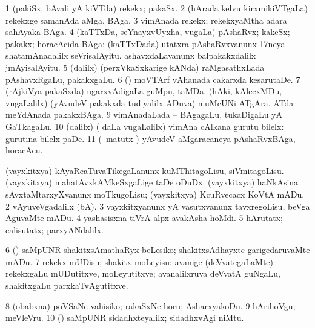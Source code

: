 {{{{{{\bentry
{} 
\gl{\nA}
\expl{}
\bmng
\bnum
\num{1} (pakiSx, bAvali yA kiVTda) rekekx; pakaSx. 
\num{2} (hArada kelvu kirxmikiVTgaLa) rekekxge samanAda aMga, BAga. 
\num{3} vimAnada rekekx; rekekxyaMtha adara sahAyaka BAga. 
\num{4} (kaTTxDa, seYnayxvUyxha, \mo vugaLa) pAshaRvx; kakeSx; pakakx; horacAcida BAga:  (kaTTxDada) utatxra pAshaRvxvanunx 17neya shatamAnadalilx seVrisalAyitu.  ashavxdaLavanunx balpakakxdalilx jmAyisalAyitu. 
\num{5} (\bava dalilx) (perxVkaSxkarige kANda) raMgasathxLada pAshavxRgaLu, pakakxgaLu. 
\num{6} (\birx) moVTArf vAhanada cakarxda kesarutaDe. 
\num{7} (rAjkiVya pakaSxda) ugarxvAdigaLa guMpu, taMDa. 
 (hAki, kAlecxMDu, \mo vugaLalilx) 
\banum
{} (yAvudeV pakakxda tudiyalilx ADuva) muMcUNi ATgAra. 
 ATda meYdAnada pakakxBAga. 
\eanum
\numie
\num{9} vimAnadaLada -- BAgagaLu, tukaDigaLu yA GaTkagaLu. 
\num{10} (\bava dalilx) ( daLa \mo vugaLalilx) vimAna cAlkana gurutu bilelx:  gurutina bilelx paDe. 
\num{11} (\aMrashA\ matutx \savi) yAvudeV aMgaracaneya pAshaRvxBAga, horacAcu. 
\enum
\emng

\noindent
\gl{\pagu}
\bmng
\bnum
{}  
\banum
{} (vayxkitxya) kAyaRcaTuvaTikegaLanunx kuMThitagoLisu, siVmitagoLisu. 
 (vayxkitxya) mahatAvxkAMkeSxgaLige taDe oDuDx. 
 (vayxkitxya) haNkAsina sAvxtaMtarxyXvanunx moTkugoLisu; (vayxkitxya) KcuRvecacx KoVtA mADu. 
\eanum
\numie
\num{2}  vAyuveVgadalilx (bA). 
\num{3}  vayxkitxyanunx yA vasutxvanunx tavxregoLisu, beVga AguvaMte mADu. 
\num{4}  yashasisxna tiVrA alpx avakAsha hoMdi. 
\num{5} hArutatx; calisutatx; parxyANdalilx. 
\num{6}  (\rUpa) saMpUNR shakitxsAmathaRyx beLesiko; shakitxsAdhayxte garigedaruvaMte mADu. 
\num{7}  rekekx mUDisu; shakitx moLeyisu:  avanige (deVvategaLaMte) rekekxgaLu mUDutitxve, moLeyutitxve; avanalilxruva deVvatA guNgaLu, shakitxgaLu parxkaTvAgutitxve. 
\num{8}  (obabxna) poVSaNe vahisiko; rakaSxNe horu; AsharxyakoDu. 
\num{9}  hArihoVgu; meVleVru. 
\num{10}  (\rUpa) saMpUNR sidadhxteyalilx; sidadhxvAgi niMtu. 
\enum
\emng
\eentry

}}}}}}
